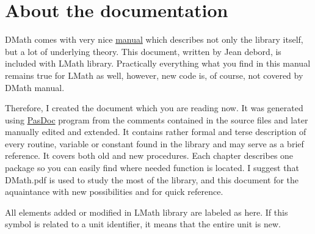 \documentclass[12pt,a4paper,oneside]{report}
\newcommand{\lmath}[1]{   %
	\marginpar{\vspace{#1} 
		\begin{flushright}
			LMath
	\end{flushright} }
}
\begin{document}
\section*{About the documentation} 
DMath comes with very nice \href{DMath.pdf}{manual} which describes not only the library itself, but a lot of underlying theory. This document, written by Jean debord, is included with LMath library. Practically everything what you find in this manual remains true for LMath as well, however, new code is, of course, not covered by DMath manual. 

Therefore, I created the document which you are reading now. It was generated using \href{https://sourceforge.net/projects/pasdoc/}{PasDoc} program from the comments contained in the source files and later manually edited and extended. It contains rather formal and terse description of every routine, variable or constant found in the library and may serve as a brief reference. It covers both old and new procedures. Each chapter describes one package so you can easily find where needed function is located. I suggest that DMath.pdf is used to study the most of the library, and this document for the aquaintance with new possibilities and for quick reference.

All elements added or modified in LMath library are labeled as here. If this symbol is related to a unit identifier, it means that the entire unit is new. \lmath{-28pt} 
\end{document}
